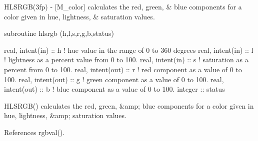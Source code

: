 \begin{DoxyDescription}
\item[\label{_HLSRGB}%
N\+A\+ME ]H\+L\+S\+R\+G\+B(3fp) -\/ \mbox{[}M\+\_\+color\mbox{]} calculates the red, green, \& blue components for a color given in hue, lightness, \& saturation values. 


\item[S\+Y\+N\+O\+P\+S\+IS ]
\begin{DoxyPre}
    subroutine hlsrgb (h,l,s,r,g,b,status)\end{DoxyPre}



\begin{DoxyPre}     real, intent(in)  :: h ! hue value in the range of 0 to 360 degrees
     real, intent(in)  :: l ! lightness as a percent value from 0 to 100.
     real, intent(in)  :: s ! saturation as a percent from 0 to 100.
     real, intent(out) :: r ! red component as a value of 0 to 100.
     real, intent(out) :: g ! green component as a value of 0 to 100.
     real, intent(out) :: b ! blue component as a value of 0 to 100.
     integer           :: status
    \end{DoxyPre}
 


\item[D\+E\+S\+C\+R\+I\+P\+T\+I\+ON ]\begin{DoxyVerb}HLSRGB() calculates the red, green, &amp; blue components for a
 color given in hue, lightness, &amp; saturation values.
\end{DoxyVerb}
 


\end{DoxyDescription}

References rgbval().

\mbox{\label{namespacem__color_a56dd07bbf1378ccc78a230d171f9d429}} 
